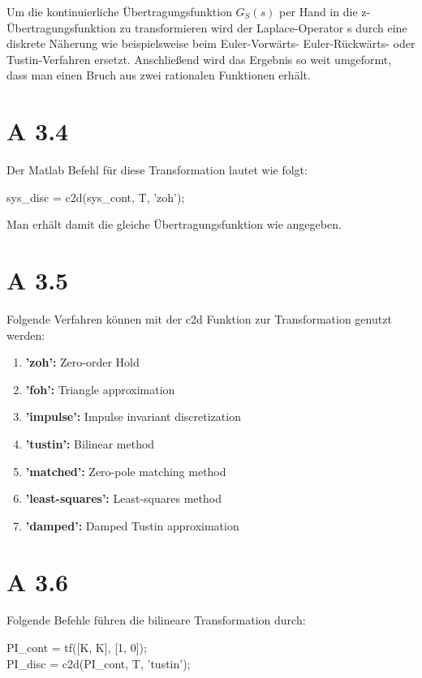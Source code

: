 Um die kontinuierliche Übertragungsfunktion $G_S(s)$ per Hand in die z-Übertragungsfunktion zu transformieren wird der Laplace-Operator s durch eine diskrete Näherung wie beispielsweise beim Euler-Vorwärts- Euler-Rückwärts- oder Tustin-Verfahren ersetzt. Anschließend wird das Ergebnis so weit umgeformt, dass man einen Bruch aus zwei rationalen Funktionen erhält.

\newpage

\section*{A 3.4}

Der Matlab Befehl für diese Transformation lautet wie folgt:
\begin{center}
	sys\_disc = c2d(sys\_cont, T, 'zoh');
\end{center}

Man erhält damit die gleiche Übertragungsfunktion wie angegeben.


\section*{A 3.5}
Folgende Verfahren können mit der c2d Funktion zur Transformation genutzt werden:

\begin{enumerate}
	\item \textbf{'zoh':} Zero-order Hold
	\item \textbf{'foh':} Triangle approximation
	\item \textbf{'impulse':} Impulse invariant discretization
	\item \textbf{'tustin':} Bilinear method
	\item \textbf{'matched':} Zero-pole matching method
	\item \textbf{'least-squares':} Least-squares method
	\item \textbf{'damped':} Damped Tustin approximation
\end{enumerate}

\section*{A 3.6}
Folgende Befehle führen die bilineare Transformation durch:
\begin{center}
	PI\_cont = tf([K, K], [1, 0]);\\
	PI\_disc = c2d(PI\_cont, T, 'tustin');
\end{center}

